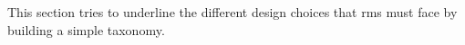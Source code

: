 This section tries to underline the different design choices that \glspl{rm} must face by building a simple taxonomy.